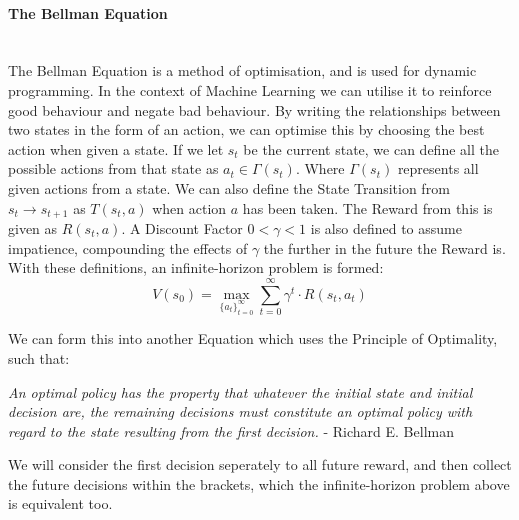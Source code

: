 \begin{flushleft}
                \paragraph{The Bellman Equation} \mbox{} \\
                    The Bellman Equation is a method of optimisation, and is used for dynamic programming. In the context of Machine Learning we can utilise it
                    to reinforce good behaviour and negate bad behaviour. By writing the relationships between two states in the form of an action, we can optimise this
                    by choosing the best action when given a state. If we let $s_{t}$ be the current state, we can define all the possible actions from that state as
                    $a_{t} \in \Gamma(s_{t})$. Where $\Gamma(s_{t})$ represents all given actions from a state. We can also define the State Transition from $s_{t} \to s_{t+1}$ 
                    as $T(s_{t}, a)$ when action $a$ has been taken. The Reward from this is given as $R(s_{t}, a)$. A Discount Factor $0 < \gamma < 1$ is also defined to assume
                    impatience, compounding the effects of $\gamma$ the further in the future the Reward is. \\
                    \vspace{0.2cm}
                    With these definitions, an infinite-horizon problem is formed: \\

                    \[ V(s_{0}) = \max_{\{a_{t}\}_{t=0}^{\infty}} \sum_{t=0}^{\infty} \gamma^{t} \cdot R(s_{t},a_{t}) \]
                    \vspace{0.2cm}

                    We can form this into another Equation which uses the Principle of Optimality, such that: \\
                    \vspace{0.2cm}

                    \begin{center}
                        \textit{An optimal policy has the property that whatever the initial state and initial decision are, the remaining decisions must constitute an 
                        optimal policy with regard to the state resulting from the first decision.} - Richard E. Bellman
                    \end{center}
                    \vspace{0.2cm}

                    We will consider the first decision seperately to all future reward, and then collect the future decisions within the brackets, which the infinite-horizon problem
                    above is equivalent too.


\end{flushleft}
